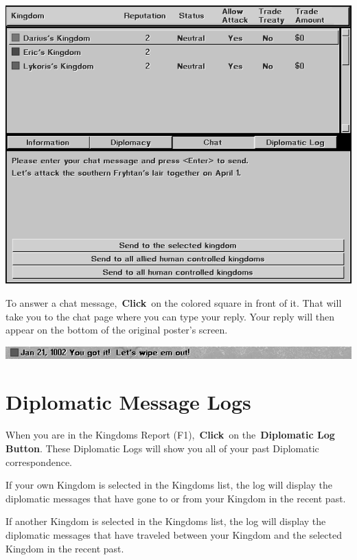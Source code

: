 \begin{center}
	\includegraphics[width=0.7\linewidth]{Imutlichat}
\end{center}

To answer a chat message, \textbf{Click} on the colored square in front of it. That will take you to the chat page where you can type your reply. Your reply will then appear on the bottom of the original poster’s screen.

\begin{center}
	\includegraphics[width=0.7\linewidth]{Imutlichat_message}
\end{center}

\section{Diplomatic Message Logs}

When you are in the Kingdoms Report (F1), \textbf{Click} on the \textbf{Diplomatic Log Button}. These Diplomatic Logs will show you all of your past Diplomatic correspondence.

If your own Kingdom is selected in the Kingdoms list, the log will display the diplomatic messages that have gone to or from your Kingdom in the recent past.

If another Kingdom is selected in the Kingdoms list, the log will display the diplomatic messages that have traveled between your Kingdom and the selected Kingdom in the recent past.